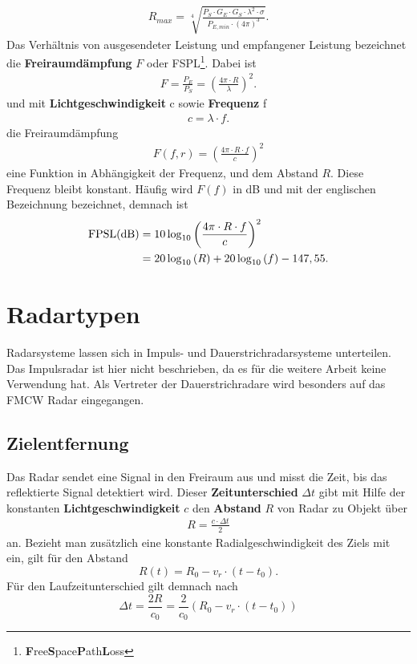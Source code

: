\begin{align}
R_{max} = \sqrt[4]{\frac{P_{S} \cdot G_{E}\cdot G_{S} \cdot \lambda^2 \cdot \sigma}{P_{E,min} \cdot (4\pi)^3}}.
\end{align}
Das Verhältnis von ausgesendeter Leistung und empfangener Leistung bezeichnet die \textbf{Freiraumdämpfung} $F$ oder FSPL\footnote{\textbf{F}ree\textbf{S}pace\textbf{P}ath\textbf{L}oss}. Dabei ist
\begin{align}
F = \frac{P_{E}}{P_{S}} = \left(\frac{4\pi \cdot R}{\lambda}\right)^2.
\end{align} 
und mit \textbf{Lichtgeschwindigkeit} c sowie \textbf{Frequenz} f
\begin{align}
c = \lambda \cdot f.
\label{eq:fzulambda}
\end{align}
die Freiraumdämpfung
\begin{align}
F(f,r) = \left(\frac{4\pi \cdot R \cdot f}{c}\right)^2
\end{align}
eine Funktion in Abhängigkeit der Frequenz, und dem Abstand $R$. Diese Frequenz bleibt konstant. Häufig wird $F(f)$ in dB und mit der englischen Bezeichnung bezeichnet, demnach ist
\begin{align}
\text{FPSL(dB)} &= 10\log_{10}\left(\frac{4\pi \cdot R \cdot f}{c}\right)^2 \notag \\
&= 20 \log_{10}\left( R \right) + 20 \log_{10}\left( f \right) - 147,55 .
\end{align}

\section{Radartypen}
Radarsysteme lassen sich in Impuls- und Dauerstrichradarsysteme unterteilen. Das Impulsradar ist hier nicht beschrieben, da es für die weitere Arbeit keine  Verwendung hat. Als Vertreter der Dauerstrichradare wird besonders auf das FMCW Radar eingegangen.

\subsection{Zielentfernung}
Das Radar sendet eine Signal in den Freiraum aus und misst die Zeit, bis das reflektierte Signal detektiert wird. Dieser \textbf{Zeitunterschied} $\Delta t$ gibt mit Hilfe der konstanten \textbf{Lichtgeschwindigkeit} $c$ den \textbf{Abstand} $R$ von Radar zu Objekt über
\begin{align}
R = \frac{c \cdot \Delta t}{2} 
\end{align} 
an. Bezieht man zusätzlich eine konstante Radialgeschwindigkeit des Ziels mit ein, gilt für den Abstand 
\begin{equation}
R(t) = R_{0} - v_{r} \cdot \left( t-t_{0}\right).
\end{equation}
Für den Laufzeitunterschied gilt demnach nach \cite[Gl. 3.1.11]{HuderRadar}
\begin{equation}
\Delta t = \frac{2R}{c_{0}}
		 = \frac{2}{c_{0}}\left(R_{0} - v_{r} \cdot \left( t-t_{0}\right)\right)
\label{eq:AbstandZuDeltaT}
\end{equation}

